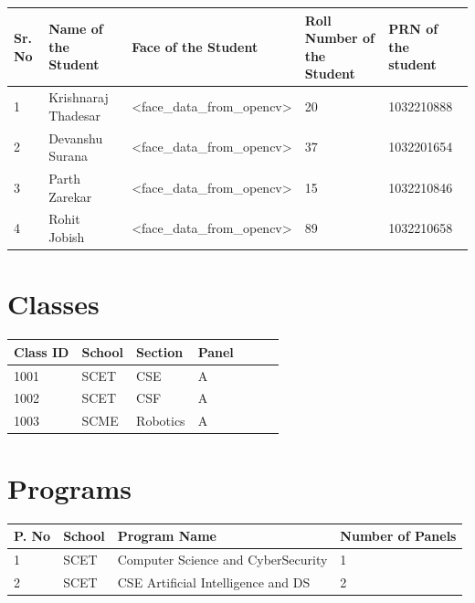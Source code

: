 \documentclass[11pt]{article}
\begin{document}
\begin{table}[H]
    \begin{tabular}{|l|l|l|l|l|}
    \hline
    Sr. No & Name of the Student & Face of the Student                               & Roll Number of the Student & PRN of the student \\ \hline
    1      & Krishnaraj Thadesar & \textless{}face\_data\_from\_opencv\textgreater{} & 20                         & 1032210888         \\ \hline
    2      & Devanshu Surana     & \textless{}face\_data\_from\_opencv\textgreater{} & 37                         & 1032201654         \\ \hline
    3      & Parth Zarekar       & \textless{}face\_data\_from\_opencv\textgreater{} & 15                         & 1032210846         \\ \hline
    4      & Rohit Jobish        & \textless{}face\_data\_from\_opencv\textgreater{} & 89                         & 1032210658         \\ \hline
    \end{tabular}
\end{table}

\section{Classes}

\begin{table}[H]
    \begin{tabular}{|l|l|l|l|l|l|l|}
    \hline
    Class ID & School & Section  & Panel \\ \hline
    1001     & SCET   & CSE      & A     \\ \hline
    1002     & SCET   & CSF      & A     \\ \hline
    1003     & SCME   & Robotics & A     \\ \hline
    \end{tabular}
    \end{table}

\section{Programs}

\begin{table}[H]
    \begin{tabular}{|l|l|l|l|}
    \hline
    P. No & School & Program Name                       & Number of  Panels \\ \hline
    1     & SCET   & Computer Science and CyberSecurity & 1                 \\ \hline
    2     & SCET   & CSE Artificial Intelligence and DS & 2                 \\ \hline
    \end{tabular}
\end{table}
\end{document}
